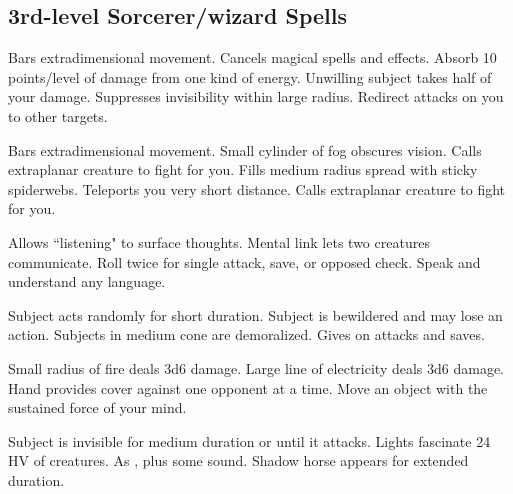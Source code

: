 \subsection{3rd-level Sorcerer/wizard Spells} 
\begin{swspelllist}
 Bars extradimensional movement.
 Cancels magical spells and effects.
 Absorb 10 points/level of damage from one kind of energy.
 Unwilling subject takes half of your damage.
 Suppresses invisibility within large radius.
 Redirect attacks on you to other targets.

 Bars extradimensional movement.
 Small cylinder of fog obscures vision.
 Calls extraplanar creature to fight for you.
 Fills medium radius spread with sticky spiderwebs.
 Teleports you very short distance.
 Calls extraplanar creature to fight for you.

 Allows ``listening" to surface thoughts.
 Mental link lets two creatures communicate.
 Roll twice for single attack, save, or opposed check.
 Speak and understand any language.

 Subject acts randomly for short duration.
 Subject is bewildered and may lose an action.
 Subjects in medium cone are demoralized.
 Gives  on attacks and saves.

 Small radius of fire deals 3d6 damage.
 Large line of electricity deals 3d6 damage.
 Hand provides cover against one opponent at a time.
 Move an object with the sustained force of your mind.

 Subject is invisible for medium duration or until it attacks.
 Lights fascinate 24 HV of creatures.
 As , plus some sound.
 Shadow horse appears for extended duration.


\end{swspelllist}
